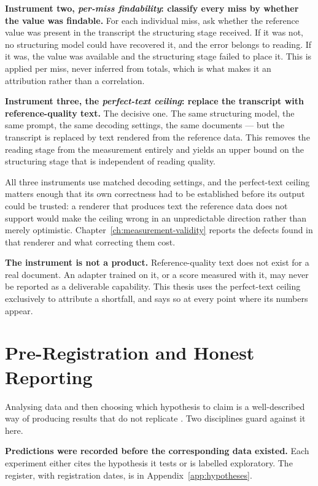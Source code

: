 \textbf{Instrument two, \emph{per-miss findability}: classify every miss by whether the
value was findable.} For each
individual miss, ask whether the reference value was present in the transcript the structuring
stage received. If it was not, no structuring model could have recovered it, and the error
belongs to reading. If it was, the value was available and the structuring stage failed to
place it. This is applied per miss, never inferred from totals, which is what makes it an
attribution rather than a correlation.

\textbf{Instrument three, the \emph{perfect-text ceiling}: replace the transcript with
reference-quality text.} The decisive
one. The same structuring model, the same prompt, the same decoding settings, the same
documents --- but the transcript is replaced by text rendered from the reference data. This
removes the reading stage from the measurement entirely and yields an upper bound on the
structuring stage that is independent of reading quality.

All three instruments use matched decoding settings, and the perfect-text ceiling matters enough that
its own correctness had to be established before its output could be trusted: a renderer that
produces text the reference data does not support would make the ceiling wrong in an
unpredictable direction rather than merely optimistic. Chapter~\ref{ch:measurement-validity}
reports the defects found in that renderer and what correcting them cost.

\textbf{The instrument is not a product.} Reference-quality text does not exist for a real
document. An adapter trained on it, or a score measured with it, may never be reported as a
deliverable capability. This thesis uses the perfect-text ceiling exclusively to attribute a
shortfall, and says so at every point where its numbers appear.

\section{Pre-Registration and Honest Reporting}
\label{sec:method-hypotheses}

Analysing data and then choosing which hypothesis to claim is a well-described way of
producing results that do not replicate \parencite{kerr1998}. Two disciplines guard against it
here.

\textbf{Predictions were recorded before the corresponding data existed.} Each experiment
either cites the hypothesis it tests or is labelled exploratory. The register, with
registration dates, is in Appendix~\ref{app:hypotheses}.

